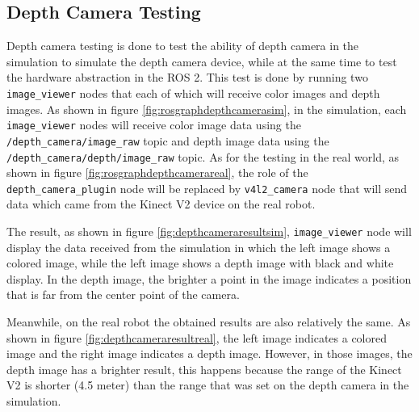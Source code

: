 \subsection{Depth Camera Testing}
\label{subsec:depthcameratesting}




Depth camera testing is done to test the ability of depth camera in the simulation to simulate the depth camera device,
  while at the same time to test the hardware abstraction in the ROS 2.
This test is done by running two \lstinline{image_viewer} nodes that each of which will receive color images and depth images.
As shown in figure \ref{fig:rosgraphdepthcamerasim},
  in the simulation,
  each \lstinline{image_viewer} nodes will receive color image data using the \lstinline{/depth_camera/image_raw} topic and depth image data using the \lstinline{/depth_camera/depth/image_raw} topic.
As for the testing in the real world,
  as shown in figure \ref{fig:rosgraphdepthcamerareal},
  the role of the \lstinline{depth_camera_plugin} node will be replaced by \lstinline{v4l2_camera} node that will send data which came from the Kinect V2 device on the real robot.



The result,
  as shown in figure \ref{fig:depthcameraresultsim},
  \lstinline{image_viewer} node will display the data received from the simulation in which the left image shows a colored image,
  while the left image shows a depth image with black and white display.
In the depth image,
  the brighter a point in the image indicates a position that is far from the center point of the camera.



Meanwhile,
  on the real robot the obtained results are also relatively the same.
As shown in figure \ref{fig:depthcameraresultreal},
  the left image indicates a colored image and the right image indicates a depth image.
However,
  in those images,
  the depth image has a brighter result,
  this happens because the range of the Kinect V2 is shorter (4.5 meter) than the range that was set on the depth camera in the simulation.
